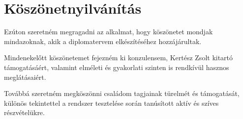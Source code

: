 \chapter*{Köszönetnyilvánítás}

Ezúton szeretném megragadni az alkalmat, hogy köszönetet mondjak mindazoknak, akik a diplomatervem elkészítéséhez hozzájárultak.

\bigskip

Mindenekelőtt köszönetemet fejezném ki konzulensem, Kertész Zsolt kitartó támogatásáért, valamint elméleti és gyakorlati szinten is rendkívül hasznos meglátásaiért.

Továbbá szeretném megköszönni családom tagjainak türelmét és támogatását, különös tekintettel a rendszer tesztelése során tanúsított aktív és szíves részvételükre.